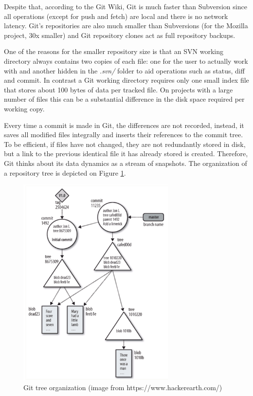 Despite that, according to the Git Wiki\cite{ref:gitwiki}, Git is much faster than Subversion since all operations (except for push and fetch) are local and there is no network latency. Git's repositories are also much smaller than Subversions (for the Mozilla project, 30x smaller) and Git repository clones act as full repository backups.

One of the reasons for the smaller repository size is that an SVN working directory always contains two copies of each file: one for the user to actually work with and another hidden in the \textit{.svn/} folder to aid operations such as status, diff and commit. In contrast a Git working directory requires only one small index file that stores about 100 bytes of data per tracked file. On projects with a large number of files this can be a substantial difference in the disk space required per working copy.

Every time a commit is made in Git, the differences are not recorded, instead, it saves all modified files integrally and inserts their references to the commit tree. To be efficient, if files have not changed, they are not redundantly stored in disk, but a link to the previous identical file it has already stored is created. Therefore, Git thinks about its data dynamics as a stream of snapshots. The organization of a repository tree is depicted on Figure \ref{fig:git_architecture}.

\begin{figure}[h]
  \centering
  \includegraphics[width=0.7\textwidth]{figures/git_architecture.png}
  \caption{Git tree organization (image from https://www.hackerearth.com/)}
  \label{fig:git_architecture}
\end{figure}


